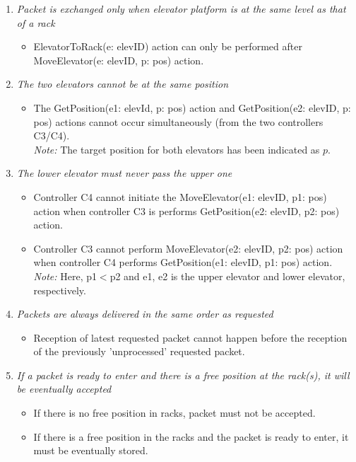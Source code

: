 \begin{enumerate}
\item \textit{Packet is exchanged only when elevator platform is at the same level as that of a rack}
	\begin{itemize}
	\item ElevatorToRack(e: elevID) action can only be performed after
	MoveElevator(e: elevID, p: pos) action.
	\end{itemize}
	
\item \textit{The two elevators cannot be at the same position}
	\begin{itemize}
	\item The GetPosition(e1: elevId, p: pos) action and
	GetPosition(e2: elevID, p: pos) actions cannot occur
	simultaneously (from the two controllers C3/C4).\\
	\textit{Note:} The target position for both elevators has been
	indicated as $p$.
	\end{itemize}
		
\item \textit{The lower elevator must never pass the upper one}
	\begin{itemize}
	\item Controller C4 cannot initiate the MoveElevator(e1: elevID, p1: pos) action when controller C3 is performs GetPosition(e2: elevID, p2: pos) action.
	\item Controller C3 cannot perform MoveElevator(e2: elevID, p2: pos) 
	action when controller C4 performs GetPosition(e1: elevID, p1: pos) 
	action.\\
	\textit{Note:} Here, p1$<$p2 and e1, e2 is the upper elevator and 
	lower elevator, respectively.
	\end{itemize}
	
	
\item \textit{Packets are always delivered in the same order as
	requested}	
	\begin{itemize}
	\item Reception of latest requested packet cannot happen before
	the reception of the previously 'unprocessed' requested packet.
	\end{itemize}
	
\item \textit{If a packet is ready to enter and there is a free
	position at the rack(s), it will be eventually accepted}
	\begin{itemize}
	\item If there is no free position in racks, packet must not be 
	accepted.
	\item If there is a free position in the racks and the packet is 
	ready to enter, it must be eventually stored.
	\end{itemize}
	

\end{enumerate}
